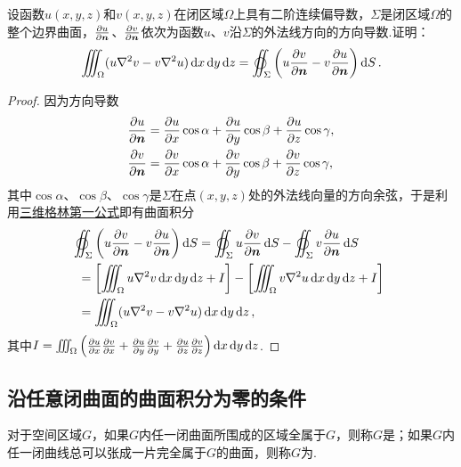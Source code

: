 \begin{example}[三维格林第二公式]
设函数\(u(x,y,z)\)和\(v(x,y,z)\)在闭区域\(\Omega\)上具有二阶连续偏导数，\(\Sigma\)是闭区域\(\Omega\)的整个边界曲面，\(\pdv{u}{\boldsymbol{n}}\)、\(\pdv{v}{\boldsymbol{n}}\)依次为函数\(u\)、\(v\)沿\(\Sigma\)的外法线方向的方向导数.证明：
\begin{equation}\label{equation:线积分与面积分.三维格林第二公式}
\iiint_{\Omega} (u \laplacian{v} - v \laplacian{u}) \dd{x}\dd{y}\dd{z}
=\varoiint_\Sigma \left( u \pdv{v}{\vb{n}} - v \pdv{u}{\vb{n}} \right) \dd{S}.
\end{equation}
\begin{proof}
\def\Io{\iiint_{\Omega} \left(%
\pdv{u}{x} \pdv{v}{x}%
+\pdv{u}{y} \pdv{v}{y}%
+\pdv{u}{z} \pdv{v}{z}%
\right) \dd{x}\dd{y}\dd{z}}%
因为方向导数\begin{align*}
\pdv{u}{\boldsymbol{n}}
&= \pdv{u}{x} \cos\alpha
+ \pdv{u}{y} \cos\beta
+ \pdv{u}{z} \cos\gamma, \\
\pdv{v}{\boldsymbol{n}}
&= \pdv{v}{x} \cos\alpha
+ \pdv{v}{y} \cos\beta
+ \pdv{v}{z} \cos\gamma,
\end{align*}其中\(\cos\alpha\)、\(\cos\beta\)、\(\cos\gamma\)是\(\Sigma\)在点\((x,y,z)\)处的外法线向量的方向余弦，于是利用\hyperref[equation:线积分与面积分.三维格林第一公式]{三维格林第一公式}即有曲面积分\begin{align*}
&\hspace{-5pt}\varoiint_\Sigma \left( u \pdv{v}{\vb{n}} - v \pdv{u}{\vb{n}} \right) \dd{S}
= \varoiint_\Sigma u \pdv{v}{\vb{n}} \dd{S}
- \varoiint_\Sigma v \pdv{u}{\vb{n}} \dd{S} \\
&= \left[ \iiint_{\Omega} u \laplacian{v} \dd{x}\dd{y}\dd{z} + I \right]
- \left[ \iiint_{\Omega} v \laplacian{u} \dd{x}\dd{y}\dd{z} + I \right] \\
&= \iiint_{\Omega} (u \laplacian{v} - v \laplacian{u}) \dd{x}\dd{y}\dd{z},
\end{align*}其中\(I = \Io\).
\end{proof}
\end{example}

\subsection{沿任意闭曲面的曲面积分为零的条件}
\begin{definition}
对于空间区域\(G\)，如果\(G\)内任一闭曲面所围成的区域全属于\(G\)，则称\(G\)是；如果\(G\)内任一闭曲线总可以张成一片完全属于\(G\)的曲面，则称\(G\)为.
\end{definition}

